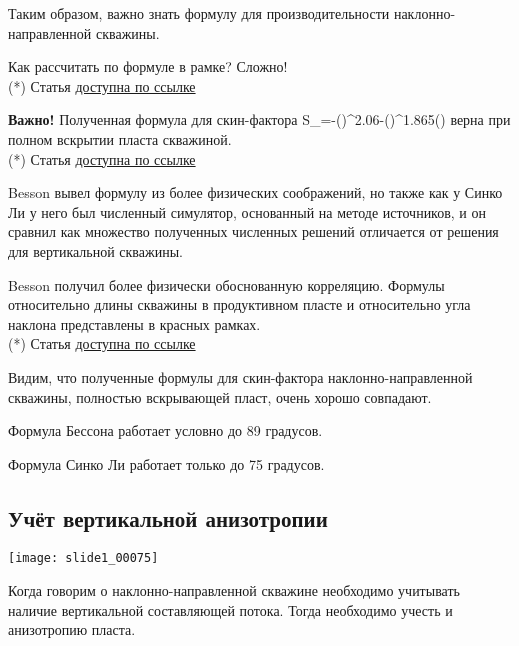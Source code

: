 \documentclass[main.tex]{subfiles}
\begin{document}
Таким образом, важно знать формулу для производительности наклонно-направленной скважины.

Как рассчитать по формуле в рамке? Сложно!\\

(*) Статья \href{https://mualal.github.io/source/tex/hydrocarbons2022/articles/cinco1975.pdf}{доступна по ссылке}


\textbf{Важно!} Полученная формула для скин-фактора
\beq
S_\theta=-\left(\right)^{2.06}-\left(\right)^{1.865}\cdot{}\left(\right)
\eeq
верна при полном вскрытии пласта скважиной.\\

(*) Статья \href{https://mualal.github.io/source/tex/hydrocarbons2022/articles/cinco1975.pdf}{доступна по ссылке}


Besson вывел формулу из более физических соображений, но также как у Синко Ли у него был численный симулятор, основанный на методе источников, и он сравнил как множество полученных численных решений отличается от решения для вертикальной скважины.

Besson получил более физически обоснованную корреляцию. Формулы относительно длины скважины в продуктивном пласте и относительно угла наклона представлены в красных рамках.\\

(*) Статья \href{https://mualal.github.io/source/tex/hydrocarbons2022/articles/besson1990.pdf}{доступна по ссылке}


Видим, что полученные формулы для скин-фактора наклонно-направленной скважины, полностью вскрывающей пласт, очень хорошо совпадают.

Формула Бессона работает условно до 89 градусов.

Формула Синко Ли работает только до 75 градусов.

\subsection{Учёт вертикальной анизотропии}

\texttt{[image: slide1\_00075]}

Когда говорим о наклонно-направленной скважине необходимо учитывать наличие вертикальной составляющей потока. Тогда необходимо учесть и анизотропию пласта.\\
\end{document}
